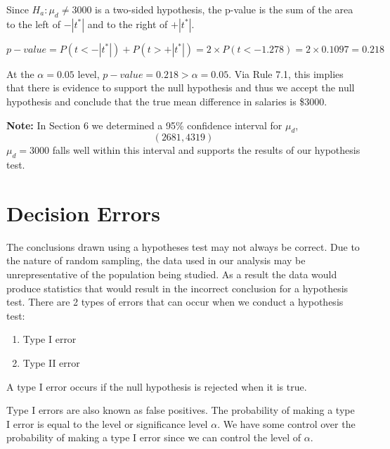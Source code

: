 \begin{example}
Since $H_a: \mu_d \neq 3000$ is a two-sided hypothesis, the p-value is the sum of the area to the left of $-|t^{*}|$ and to the right of $+|t^{*}|$.

\[p-value = P(t < - |t^{*}|) + P(t > + |t^{*}|) = 2 \times P(t < -1.278) = 2 \times 0.1097 = 0.218 \]

At the $\alpha = 0.05$ level, $p-value = 0.218 > \alpha = 0.05$. Via Rule 7.1, this implies that there is evidence to support the null hypothesis and thus we accept the null hypothesis and conclude that the true mean difference in salaries is \$3000.

\textbf{Note:} In Section 6 we determined a 95\% confidence interval for $\mu_d$,
\[ (2681,4319)\]
$\mu_d=3000$ falls well within this interval and supports the results of our hypothesis test.
\end{example}










\section{Decision Errors}
\label{sectionErrors}

The conclusions drawn using a hypotheses test may not always be correct. Due to the nature of random sampling, the data used in our analysis may be unrepresentative of the population being studied. As a result the data would produce statistics that would result in the
incorrect conclusion for a hypothesis test. There are 2 types of errors that can occur when we conduct a hypothesis test:

\begin{enumerate}
\item	Type I error
\item	Type II error
\end{enumerate}


\begin{definition}	
A type I error occurs if the null hypothesis is rejected when it is true.
\end{definition}

Type I errors are also known as false positives. The probability of making a type I error is  equal to the level or significance level $\alpha$. We have some control over the probability of making a type I error since we can control the level of $\alpha$.

